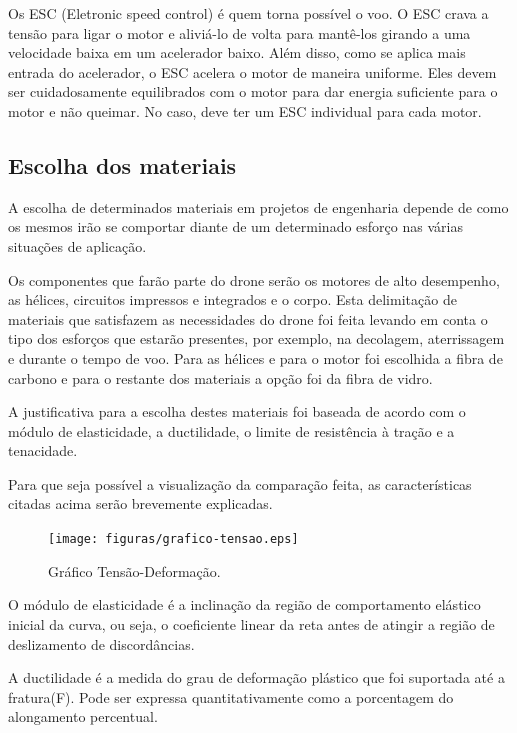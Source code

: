 Os ESC (Eletronic speed control) é quem torna possível o voo. O ESC crava a tensão para ligar o motor e aliviá-lo de volta para mantê-los girando a uma velocidade baixa em um acelerador baixo. Além disso, como se aplica mais entrada do acelerador, o ESC acelera o motor de maneira uniforme.  Eles devem ser cuidadosamente equilibrados com o motor para dar energia suficiente para o motor e não queimar. No caso, deve ter um ESC individual para cada motor. 

\subsection{Escolha dos materiais}

A escolha de determinados materiais em projetos de engenharia depende de como os mesmos irão se comportar diante de um determinado esforço nas várias situações de aplicação.

Os componentes que farão parte do drone serão os motores de alto desempenho, as hélices, circuitos impressos e integrados e o corpo.
Esta delimitação de materiais que satisfazem as necessidades do drone foi feita levando em conta o tipo dos esforços que estarão presentes, por exemplo, na decolagem, aterrissagem e durante o tempo de voo. Para as hélices e para o motor foi escolhida a fibra de carbono e para o restante dos materiais a opção foi da fibra de vidro.

A justificativa para a escolha destes materiais foi baseada de acordo com o módulo de elasticidade, a ductilidade, o limite de resistência à tração e a tenacidade. 

Para que seja possível a visualização da comparação feita, as características citadas acima serão brevemente explicadas.


\begin{figure}[h!]
    \centering
      \texttt{[image: figuras/grafico-tensao.eps]}
    \caption{Gráfico Tensão-Deformação.}
    \label{fig:grafico-tensao}
\end{figure}

O módulo de elasticidade é a inclinação da região de comportamento elástico inicial da curva, ou seja, o coeficiente linear da reta antes de atingir a região de deslizamento de discordâncias.


A ductilidade é a medida do grau de deformação plástico que foi suportada até a fratura(F). Pode ser expressa quantitativamente como a porcentagem do alongamento percentual.

